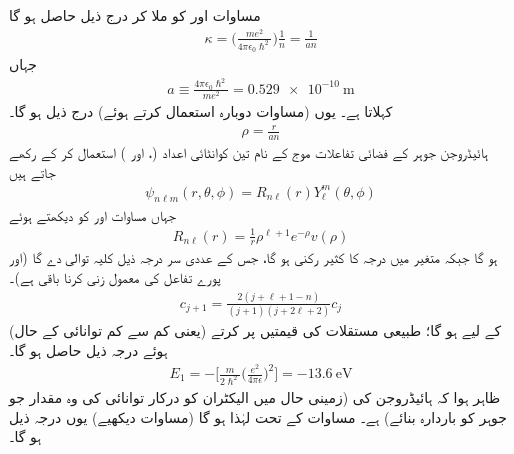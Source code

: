  مساوات  اور  کو ملا کر درج ذیل حاصل ہو گا
\begin{align}
\kappa =\big(\frac{me^{2}}{4\pi\epsilon_{0}\hslash^{2}}\big)\frac{1}{n}=\frac{1}{an} 
\end{align}
جہاں
\begin{align}\label{مساوات_تین_ابعادی_رداس_بوہر}
a\equiv\frac{4\pi\epsilon_{0}\hslash^{2}}{me^{2}}=\SI{0.529e-10}{\meter}
\end{align}
 کہلاتا ہے۔ یوں (مساوات  دوبارہ استعمال کرتے ہوئے) درج ذیل ہو گا۔
\begin{align}
\rho=\frac{r}{an} 
\end{align}
ہائیڈروجن جوہر کے فضائی تفاعلات موج کے نام تین کوانٹائی اعداد (،  اور ) استعمال کر کے رکھے جاتے ہیں 
 \begin{align}
\psi_{n\ell m}(r,\theta,\phi)=R_{n\ell}(r)Y_{\ell}^{m}(\theta,\phi) 
\end{align}
 جہاں مساوات  اور  کو دیکھتے ہوئے
 \begin{align}
R_{n\ell}(r)=\frac{1}{r}\rho^{\ell+1}e^{-\rho}v(\rho) 
\end{align} 
 ہو گا جبکہ  متغیر  میں درجہ  کا کثیر رکنی ہو گا، جس کے عددی سر درجہ ذیل کلیہ توالی دے گا (اور پورے تفاعل کی معمول زنی کرنا باقی ہے)۔
 \begin{align}\label{مساوات_ابعادی_کلیہ_توالی_کولمب_مخفیہ}
c_{j+1}=\frac{2(j+\ell+1-n)}{(j+1)(j+2\ell+2)}c_{j} 
\end{align}
 (یعنی کم سے کم توانائی کے حال) کے لیے 
  ہو گا؛ طبیعی مستقلات کی قیمتیں پر کرتے ہوئے درجہ ذیل حاصل ہو گا۔
 \begin{align}\label{مساوات_تین_ابعاد_ہائیڈروجن_بندشی_توانائی}
E_{1}=-\big[\frac{m}{2\hslash^{2}}\big(\frac{e^{2}}{4\pi\epsilon}\big)^{2}\big]=\SI{-13.6}{\electronvolt}
\end{align}
 ظاہر ہوا کہ ہائیڈروجن کی  (زمینی حال میں الیکٹران کو درکار توانائی کی وہ مقدار جو جوہر کو باردارہ بنائے)  ہے۔ مساوات  کے تحت  لہٰذا  ہو گا (مساوات  دیکھیے) یوں درجہ ذیل ہو گا۔
